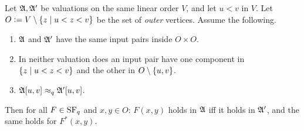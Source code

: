 \begin{lemma}[Replacement]\label{lemma: replacement}
  Let $\mathfrak{A}, \mathfrak{A}'$ be valuations on the same linear order $V$, and let $u < v$ in $V$.
  Let $O \mathrel{\vcentcolon=} V \setminus \{z \mid u < z < v\}$ be the set of \emph{outer} vertices.
  Assume the following.
  \begin{enumerate}
    \item\label{item: same outside} $\mathfrak{A}$ and $\mathfrak{A}'$ have the same input pairs inside $O \times O$.
    \item\label{item: isolated} In neither valuation does an input pair have one component in $\{z \mid u < z < v\}$ and the other in $O \setminus \{u, v\}$.
    \item\label{item: local equivalence} $\mathfrak{A}[u, v] \approx_{q} \mathfrak{A}'[u, v]$.
  \end{enumerate}
  Then for all $F \in \mathrm{SF}_{q}$ and $x, y \in O$: $F(x, y)$ holds in $\mathfrak{A}$ iff it holds in $\mathfrak{A}'$, and the same holds for $F^{*}(x, y)$.
\end{lemma}
